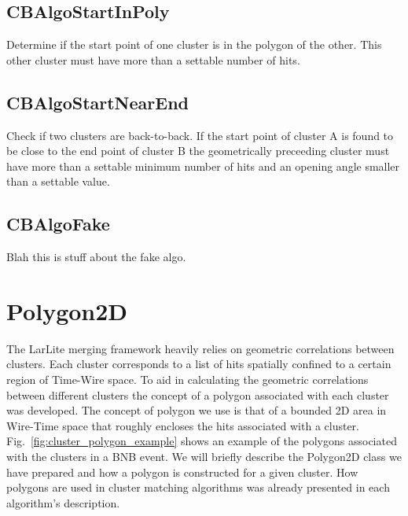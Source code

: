 \documentclass{article}
\begin{document}
\subsection{CBAlgoStartInPoly}\label{sec:CBAlgoStartInPoly}
Determine if the start point of one cluster is in the polygon of the other. This other cluster must have more than a settable
number of hits.
\subsection{CBAlgoStartNearEnd}\label{sec:CBAlgoStartNearEnd}
Check if two clusters are back-to-back. If the start point of cluster A is found to be close to the end point of cluster B
the geometrically preceeding cluster must have more than a settable minimum number of hits and an opening angle smaller
than a settable value.
\subsection{CBAlgoFake}
\label{sec:CBAlgoFake}
Blah this is stuff about the fake algo.


\newpage

\appendix

\section{Polygon2D}

The LarLite merging framework heavily relies on geometric correlations between clusters. Each cluster corresponds 
to a list of hits spatially confined to a certain region of Time-Wire space. To aid in calculating the geometric 
correlations between different clusters the concept of a polygon associated with each cluster was developed. 
The concept of polygon we use is that of a bounded 2D area in Wire-Time space that roughly encloses the hits associated
with a cluster. Fig.~\ref{fig:cluster_polygon_example} shows an example of the polygons associated with the clusters
in a BNB event.
We will briefly describe the Polygon2D class we have prepared and how a polygon is constructed for a given
cluster. How polygons are used in cluster matching algorithms was already presented in each algorithm's description.
\end{document}
